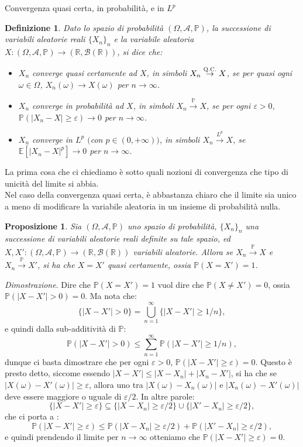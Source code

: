 \documentclass[11pt]{book}
\makeatletter
\theoremstyle{Definizione}
\newtheorem*{mydef}{Definizione}
\theoremstyle{TeoremaProposizioneLemmaCorollario}
\newtheorem{mypropo}[myteo]{Proposizione}
\theoremstyle{OsservazioneNota}
\renewenvironment{proof}[1][\proofname]{\par
  \normalfont \topsep6\p@\@plus6\p@\relax
  \trivlist
  \item[\hskip\labelsep
        \itshape
    #1\@addpunct{.}]\ignorespaces
}{%
  \endtrivlist\@endpefalse
}
\newcommand{\R}{\mathbb{R}}
\renewcommand{\P}{\mathbb{P}}
\newcommand{\E}{\mathbb{E}}
\newcommand{\toqc}{\overset{\textsc{Q.C.}}{\to}}
\newcommand{\toP}{\overset{\P}{\to}}
\newcommand{\toL}[1]{\overset{L^{#1}}{\to}}
\renewenvironment{proof}{\textsl{Dimostrazione}.}{}
\makeatother
\begin{document}
\begin{boxdef}{Convergenza quasi certa\textsl{,} in probabilità\textsl{,} e in $L^p$}
\begin{mydef}
Dato lo spazio di probabilità $(\Omega,\mathcal{A},\P)$, la successione di variabili aleatorie reali $\{X_n\}_n$ e la variabile aleatoria $X:(\Omega,\mathcal{A},\P) \longrightarrow (\R,\mathcal{B}(\R))$, si dice che:
\begin{itemize}
\item $X_n$ converge quasi certamente ad $X$, in simboli $X_n \toqc X$, se per quasi ogni $\omega\in \Omega$, $X_n(\omega) \to X(\omega)$ per $n\to \infty$.
\item $X_n$ converge in probabilità ad $X$, in simboli $X_n \toP X$, se per ogni $\varepsilon > 0$, $\P(|X_n-X|\geq \varepsilon) \to 0$ per $n \to \infty$.
\item $X_n$ converge in $L^p$ $($con $p\in (0,+\infty))$, in simboli $X_n \toL{p} X$, se $\E[|X_n-X|^p] \to 0$ per $n\to \infty$.
\end{itemize}
\end{mydef}
\end{boxdef}
\noindent
La prima cosa che ci chiediamo è sotto quali nozioni di convergenza che tipo di unicità del limite si abbia.\\
Nel caso della convergenza quasi certa, è abbastanza chiaro che il limite sia unico a meno di modificare la variabile aleatoria in un insieme di probabilità nulla.
\begin{boxpro}
\begin{mypropo}
Sia $(\Omega,\mathcal{A},\P)$ uno spazio di probabilità, $\{X_n\}_n$ una successione di variabili aleatorie reali definite su tale spazio, ed $X,X' : (\Omega,\mathcal{A},\P) \longrightarrow (\R,\mathcal{B}(\R))$ variabili aleatorie. Allora se $X_n \toP X$ e $X_n \toP X'$, si ha che $X = X'$ quasi certamente, ossia $\P(X = X') = 1$.
\end{mypropo}
\tcblower
\begin{proof}
Dire che $\P(X = X') = 1$ vuol dire che $\P( X \neq X') = 0$, ossia $\P(|X-X'| >0) = 0$. Ma nota che:
$$
\{|X-X'| > 0\} = \bigcup_{n = 1}^\infty \{|X-X'|\geq 1/n\},
$$
e quindi dalla sub-additività di $\P$:
$$
\P(|X-X'| > 0) \leq \sum_{n = 1}^\infty \P(|X-X'| \geq 1/n),
$$
dunque ci basta dimostrare che per ogni $\varepsilon > 0$, $\P(|X-X'| \geq \varepsilon) = 0$. Questo è presto detto, siccome essendo $|X-X'| \leq |X-X_n| + |X_n-X'|$, si ha che se $|X(\omega)-X'(\omega)| \geq \varepsilon$, allora uno tra $|X(\omega)-X_n(\omega)|$ e $|X_n(\omega)-X'(\omega)|$ deve essere maggiore o uguale di $\varepsilon/2$. In altre parole:
$$
\{|X-X'| \geq \varepsilon\} \subseteq \{|X-X_n|\geq \varepsilon/2\} \cup \{|X'-X_n|\geq \varepsilon/2\},
$$
che ci porta a :
$$
\P(|X-X'|\geq \varepsilon) \leq \P(|X-X_n|\geq \varepsilon/2)+\P(|X'-X_n|\geq \varepsilon/2),
$$
e quindi prendendo il limite per $n \to \infty$ otteniamo che $\P(|X-X'| \geq \varepsilon) = 0$.
\end{proof}
\end{boxpro}
\end{document}

